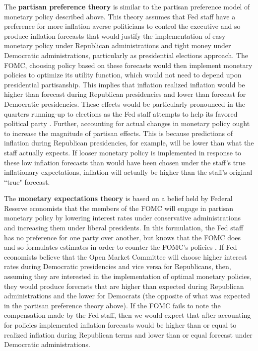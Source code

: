 \documentclass[a4paper]{article}\usepackage{graphicx, color}
\begin{document}
The {\bf{partisan preference theory}} is similar to the partisan preference model of monetary policy described above. This theory assumes that Fed staff have a preference for more inflation averse politicians to control the executive and so produce inflation forecasts that would justify the implementation of easy monetary policy under Republican administrations and tight money under Democratic administrations, particularly as presidential elections approach. The FOMC, choosing policy based on these forecasts would then implement monetary policies to optimize its utility function, which would not need to depend upon presidential partisanship. This implies that inflation realized inflation would be higher than forecast during Republican presidencies and lower than forecast for Democratic presidencies. These effects would be particularly pronounced in the quarters running-up to elections as the Fed staff attempts to help its favored political party \citep{Beck1987,Grier1987}. Further, accounting for actual changes in monetary policy ought to increase the magnitude of partisan effects. This is because predictions of inflation during Republican presidencies, for example, will be lower than what the staff actually expects. If looser monetary policy is implemented in response to these low inflation forecasts than would have been chosen under the staff's true inflationary expectations, inflation will actually be higher than the staff's original ``true" forecast.

The {\bf{monetary expectations theory}} is based on a belief held by Federal Reserve economists that the members of the FOMC will engage in partisan monetary policy by lowering interest rates under conservative administrations and increasing them under liberal presidents. In this formulation, the Fed staff has no preference for one party over another, but knows that the FOMC does and so formulates estimates in order to counter the FOMC's policies \citep{Clark2011}. If Fed economists believe that the Open Market Committee will choose higher interest rates during Democratic presidencies and vice versa for Republicans, then, assuming they are interested in the implementation of optimal monetary policies, they would produce forecasts that are higher than expected during Republican administrations and the lower for Democrats (the opposite of what was expected in the partisan preference theory above). If the FOMC fails to note the compensation made by the Fed staff, then we would expect that after accounting for policies implemented inflation forecasts would be higher than or equal to realized inflation during Republican terms and lower than or equal forecast under Democratic administrations. %
\end{document}
